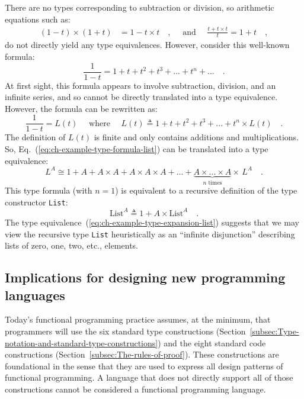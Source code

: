 There are no types corresponding to subtraction or division, so arithmetic
equations such as:
\begin{align*}
\left(1-t\right)\times\left(1+t\right) & =1-t\times t\quad,\quad\text{ and }\quad\frac{t+t\times t}{t}=1+t\quad,
\end{align*}
do not directly yield any type equivalences. However, consider this
well-known formula:
\[
\frac{1}{1-t}=1+t+t^{2}+t^{3}+...+t^{n}+...\quad.
\]
At first sight, this formula appears to involve subtraction, division,
and an infinite series, and so cannot be directly translated into
a type equivalence. However, the formula can be rewritten as:
\begin{equation}
\frac{1}{1-t}=L(t)\quad\text{ where }\quad L(t)\triangleq1+t+t^{2}+t^{3}+...+t^{n}\times L(t)\quad.\label{eq:ch-example-type-formula-list}
\end{equation}
The definition of $L(t)$ is finite and only contains additions and
multiplications. So, Eq.~(\ref{eq:ch-example-type-formula-list})
can be translated into a type equivalence:
\begin{equation}
L^{A}\cong1+A+A\times A+A\times A\times A+...+\underbrace{A\times...\times A}_{n\text{ times}}\times\,L^{A}\quad.\label{eq:ch-example-type-expansion-list}
\end{equation}
This type formula (with $n=1$) is equivalent to a recursive definition
of the type constructor \lstinline!List!:
\[
\text{List}^{A}\triangleq1+A\times\text{List}^{A}\quad.
\]
The type equivalence~(\ref{eq:ch-example-type-expansion-list}) suggests
that we may view the recursive type \lstinline!List! heuristically
as an \textsf{``}infinite disjunction\textsf{''} describing lists of zero, one, two,
etc., elements.

\subsection{Implications for designing new programming languages}

Today\textsf{'}s functional programming practice assumes, at the minimum, that
programmers will use the six standard type constructions (Section~\ref{subsec:Type-notation-and-standard-type-constructions})
and the eight standard code constructions (Section~\ref{subsec:The-rules-of-proof}).
These constructions are foundational in the sense that they are used
to express all design patterns of functional programming. A language
that does not directly support all of those constructions cannot be
considered a functional programming language.

